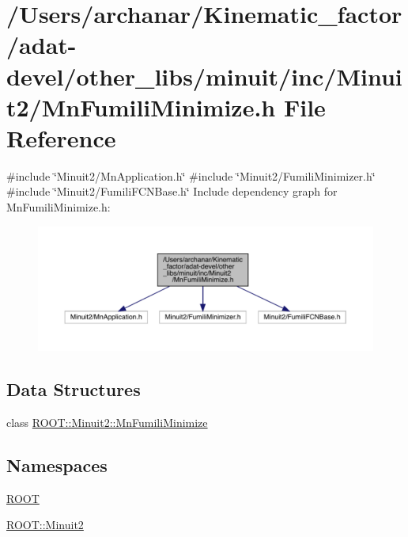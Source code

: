 \hypertarget{adat-devel_2other__libs_2minuit_2inc_2Minuit2_2MnFumiliMinimize_8h}{}\section{/\+Users/archanar/\+Kinematic\+\_\+factor/adat-\/devel/other\+\_\+libs/minuit/inc/\+Minuit2/\+Mn\+Fumili\+Minimize.h File Reference}
\label{adat-devel_2other__libs_2minuit_2inc_2Minuit2_2MnFumiliMinimize_8h}
{\ttfamily \#include \char`\"{}Minuit2/\+Mn\+Application.\+h\char`\"{}}\newline
{\ttfamily \#include \char`\"{}Minuit2/\+Fumili\+Minimizer.\+h\char`\"{}}\newline
{\ttfamily \#include \char`\"{}Minuit2/\+Fumili\+F\+C\+N\+Base.\+h\char`\"{}}\newline
Include dependency graph for Mn\+Fumili\+Minimize.\+h\+:
\nopagebreak
\begin{figure}[H]
\begin{center}
\leavevmode
\includegraphics[width=350pt]{d6/d84/adat-devel_2other__libs_2minuit_2inc_2Minuit2_2MnFumiliMinimize_8h__incl}
\end{center}
\end{figure}
\subsection*{Data Structures}
\begin{DoxyCompactItemize}
\item 
class \mbox{\hyperlink{classROOT_1_1Minuit2_1_1MnFumiliMinimize}{R\+O\+O\+T\+::\+Minuit2\+::\+Mn\+Fumili\+Minimize}}
\end{DoxyCompactItemize}
\subsection*{Namespaces}
\begin{DoxyCompactItemize}
\item 
 \mbox{\hyperlink{namespaceROOT}{R\+O\+OT}}
\item 
 \mbox{\hyperlink{namespaceROOT_1_1Minuit2}{R\+O\+O\+T\+::\+Minuit2}}
\end{DoxyCompactItemize}
